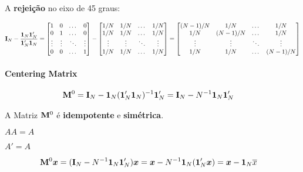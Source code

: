 \documentclass[11pt, oneside, a4paper, article]{article}
\numberwithin{equation}{section}
\begin{document}
\begin{description}
A \textbf{rejeição} no eixo de 45 graus:

\vspace{-1 em}
\begin{align*}
	\mathbf{I}_{N} - \frac{\boldsymbol{1}_{N} \boldsymbol{1}_{N}'}{\boldsymbol{1}_{N}' \boldsymbol{1}_{N}} 
	=
	\begin{bmatrix}
		1      & 0 &\dots  & 0	 \\
		0      & 1 &\dots  & 0	 \\
		\vdots & \vdots & \ddots & \vdots\\
		0      & 0 & \dots  & 1	
	\end{bmatrix}
	-
	\begin{bmatrix}
		1/N    & 1/N    & \dots  & 1/N	 \\
		1/N    & 1/N    & \dots  & 1/N	 \\
		\vdots & \vdots & \ddots & \vdots \\
		1/N    & 1/N    & \dots  & 1/N	
	\end{bmatrix}
	=
	\begin{bmatrix}
		(N-1)/N & 1/N     & \dots  & 1/N    \\
		1/N     & (N-1)/N & \dots  & 1/N    \\
		\vdots  & \vdots  & \ddots & \vdots \\
		1/N     & 1/N     & \dots  & (N-1)/N	
	\end{bmatrix}
\end{align*}

\paragraph{Centering Matrix} \cite[p. 978, A.28]{greene-7ed}

\vspace{-1 em}
\begin{align*}
	\mathbf{M}^{0} &= 
	\mathbf{I}_{N} - \boldsymbol{1}_{N} ( \boldsymbol{1}_{N}' \boldsymbol{1}_{N} )^{-1} \boldsymbol{1}_{N}'
	= 
	\mathbf{I}_{N} - N^{-1} \boldsymbol{1}_{N} \boldsymbol{1}_{N}' 
\end{align*}

A Matriz $\mathbf{M}^{0}$ é \textbf{idempotente} e \textbf{simétrica}.

\begin{description}\itemsep0pt
	\item [Idempotência:] $AA = A$
	\item [Simetria:] $A'=A$
\end{description}

\vspace{-1 em}
\begin{align*}
	\mathbf{M}^{0} \boldsymbol{x} &= 
	( \mathbf{I}_{N} - N^{-1} \boldsymbol{1}_{N} \boldsymbol{1}_{N}' ) \boldsymbol{x} 
	= 
	\boldsymbol{x} - N^{-1} \boldsymbol{1}_{N} (\boldsymbol{1}_{N}' \boldsymbol{x}) 
	= 
	\boldsymbol{x} - \boldsymbol{1}_{N} \overline{x}
\end{align*}


\end{description}
\end{document}
